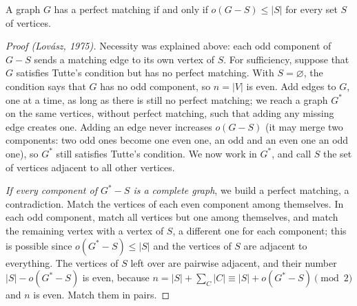 \begin{theorem}[Tutte, 1947]\label{thm:tutte}
A graph $G$ has a perfect matching if and only if $o(G-S)\le|S|$ for every set $S$ of vertices.
\end{theorem}
\begin{proof}[Proof (Lov\'asz, 1975)]
Necessity was explained above: each odd component of $G-S$ sends a matching edge to its own vertex of $S$. For sufficiency,
suppose that $G$ satisfies Tutte's condition but has no perfect matching. With $S=\varnothing$, the condition says that $G$ has no odd component,
so $n=|V|$ is even. Add edges to $G$, one at a time, as long as there is still no perfect matching; we reach a graph $G^*$ on the same vertices,
without perfect matching, such that adding any missing edge creates one. Adding an edge never increases $o(G-S)$ (it may merge two
components: two odd ones become one even one, an odd and an even one an odd one), so $G^*$ still satisfies Tutte's condition. We now
work in $G^*$, and call $S$ the set of vertices adjacent to all other vertices.

\emph{If every component of $G^*-S$ is a complete graph}, we build a perfect matching, a contradiction. Match the vertices of each
even component among themselves. In each odd component, match all vertices but one among themselves, and match the remaining
vertex with a vertex of $S$, a different one for each component; this is possible since $o(G^*-S)\le|S|$ and the vertices of $S$ are
adjacent to everything. The vertices of $S$ left over are pairwise adjacent, and their number $|S|-o(G^*-S)$ is even, because
$n=|S|+\sum_C|C|\equiv|S|+o(G^*-S)\pmod2$ and $n$ is even. Match them in pairs.


\end{proof}

